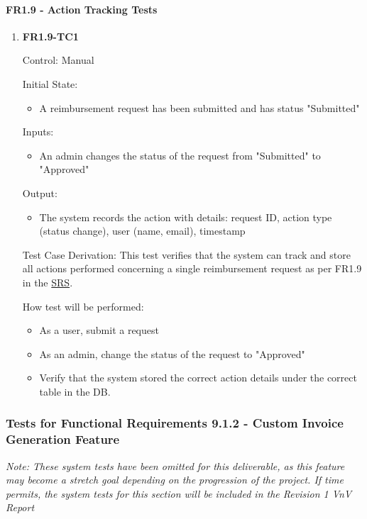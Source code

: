 \documentclass[12pt, titlepage]{article}
\begin{document}
\paragraph{FR1.9 - Action Tracking Tests}

\begin{enumerate}
    \item{\textbf{FR1.9-TC1}}
    
    Control: Manual
    
    Initial State: 
    \begin{itemize}
        \item A reimbursement request has been submitted and has status "Submitted"
    \end{itemize}
    
    Inputs: 
    \begin{itemize}
        \item An admin changes the status of the request from "Submitted" to "Approved"
    \end{itemize}
    
    Output: 
    \begin{itemize}
        \item The system records the action with details: request ID, action type (status change), user (name, email), timestamp
    \end{itemize}
    
    Test Case Derivation: This test verifies that the system can track and store all actions performed concerning a single reimbursement request as per FR1.9 in the \href{https://shorturl.at/FdAgR}{SRS}. 
    
    How test will be performed:
    \begin{itemize}
        \item As a user, submit a request
        \item As an admin, change the status of the request to "Approved"
        \item Verify that the system stored the correct action details under the correct table in the DB.
    \end{itemize}
\end{enumerate}

\subsubsection{Tests for Functional Requirements 9.1.2 - Custom Invoice Generation Feature}

\textit{Note: These system tests have been omitted for this deliverable, as this feature may become a stretch goal depending on the progression of the project. If time permits, the system tests for this section will be included in the Revision 1 VnV Report}
\end{document}
